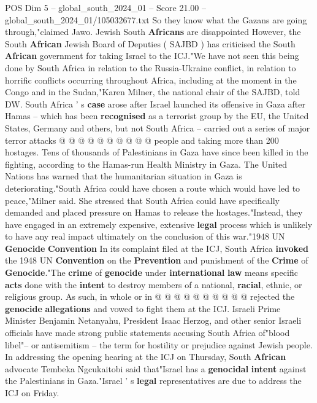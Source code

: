 \begin{textsample}{POS Dim 5 – global\_south\_2024\_01 – Score 21.00 – global\_south\_2024\_01/105032677.txt}
So they know what the Gazans are going through,"claimed Jawo.
Jewish South \textbf{Africans} are disappointed However, the South \textbf{African} Jewish Board of Deputies ( SAJBD ) has criticised the South \textbf{African} government for taking Israel to the ICJ."We have not seen this being done by South Africa in relation to the Russia-Ukraine conflict, in relation to horrific conflicts occurring throughout Africa, including at the moment in the Congo and in the Sudan,"Karen Milner, the national chair of the SAJBD, told DW.
South Africa ' s \textbf{case} arose after Israel launched its offensive in Gaza after Hamas -- which has been \textbf{recognised} as a terrorist group by the EU, the United States, Germany and others, but not South Africa -- carried out a series of major terror attacks @ @ @ @ @ @ @ @ @ @ people and taking more than 200 hostages.
Tens of thousands of Palestinians in Gaza have since been killed in the fighting, according to the Hamas-run Health Ministry in Gaza.
The United Nations has warned that the humanitarian situation in Gaza is deteriorating."South Africa could have chosen a route which would have led to peace,"Milner said.
She stressed that South Africa could have specifically demanded and placed pressure on Hamas to release the hostages."Instead, they have engaged in an extremely expensive, extensive \textbf{legal} process which is unlikely to have any real impact ultimately on the conclusion of this war."1948 UN \textbf{Genocide} \textbf{Convention} In its complaint filed at the ICJ, South Africa \textbf{invoked} the 1948 UN \textbf{Convention} on the \textbf{Prevention} and punishment of the \textbf{Crime} of \textbf{Genocide}."The \textbf{crime} of \textbf{genocide} under \textbf{international} \textbf{law} means specific \textbf{acts} done with the \textbf{intent} to destroy members of a national, \textbf{racial}, ethnic, or religious group.
As such, in whole or in @ @ @ @ @ @ @ @ @ @ rejected the \textbf{genocide} \textbf{allegations} and vowed to fight them at the ICJ.
Israeli Prime Minister Benjamin Netanyahu, President Isaac Herzog, and other senior Israeli officials have made strong public statements accusing South Africa of"blood libel"-- or antisemitism -- the term for hostility or prejudice against Jewish people.
In addressing the opening hearing at the ICJ on Thursday, South \textbf{African} advocate Tembeka Ngcukaitobi said that"Israel has a \textbf{genocidal} \textbf{intent} against the Palestinians in Gaza."Israel ' s \textbf{legal} representatives are due to address the ICJ on Friday.

\end{textsample}
